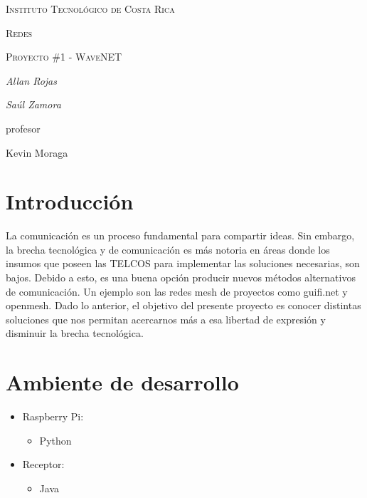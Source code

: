 \documentclass{article}
\begin{document}
\begin{titlepage}
  \centering
  {\scshape\LARGE Instituto Tecnol\'ogico de Costa Rica \par}
  \vspace{1cm}
  {\scshape\Large Redes\par}
  {\scshape\Large Proyecto \#1 - WaveNET\par}
  \vspace{1.5cm}
  {\Large\itshape Allan Rojas\par}
  {\Large\itshape Sa\'ul Zamora\par}
  \vfill
  profesor\par
  Kevin Moraga \textsc{}

  \vfill

\end{titlepage}

\section{Introducci\'on}
La comunicaci\'on es un proceso fundamental para compartir ideas. Sin embargo, la brecha tecnol\'ogica y de comunicaci\'on es m\'as notoria en \'areas donde los insumos que poseen las TELCOS para implementar las soluciones necesarias, son bajos.
Debido a esto, es una buena opci\'on producir nuevos m\'etodos alternativos de comunicaci\'on. Un ejemplo son las redes mesh de proyectos como guifi.net y openmesh.
Dado lo anterior, el objetivo del presente proyecto es conocer distintas soluciones que nos permitan acercarnos m\'as a esa libertad de expresi\'on y disminuir la brecha tecnol\'ogica.

\section{Ambiente de desarrollo}
\begin{itemize}
  \item Raspberry Pi:
  \begin{itemize}
    \item Python
  \end{itemize}
  \item Receptor:
  \begin{itemize}
    \item Java
  \end{itemize}
\end{itemize}
\end{document}
